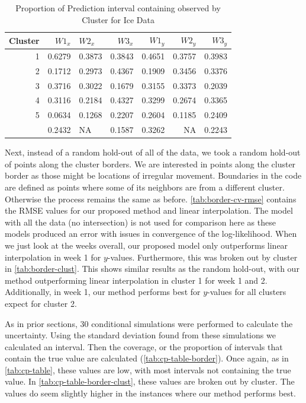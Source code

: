 \documentclass[12pt]{article}
\begin{document}
\begin{table}

\caption{\label{tab:cp-clust-actual}Proportion of Prediction interval containing observed by Cluster for Ice Data}
\centering
\begin{tabular}[t]{rrlrrrr}
\toprule
Cluster & $W1_{x}$ & $W2_{x}$ & $W3_{x}$ & $W1_{y}$ & $W2_{y}$ & $W3_{y}$\\
\midrule
1 & 0.6279 & 0.3873 & 0.3843 & 0.4651 & 0.3757 & 0.3983\\
2 & 0.1712 & 0.2973 & 0.4367 & 0.1909 & 0.3456 & 0.3376\\
3 & 0.3716 & 0.3022 & 0.1679 & 0.3155 & 0.3373 & 0.2039\\
4 & 0.3116 & 0.2184 & 0.4327 & 0.3299 & 0.2674 & 0.3365\\
5 & 0.0634 & 0.1268 & 0.2207 & 0.2604 & 0.1185 & 0.2409\\
\addlinespace
6 & 0.2432 & NA & 0.1587 & 0.3262 & NA & 0.2243\\
\bottomrule
\end{tabular}
\end{table}

Next, instead of a random hold-out of all of the data, we took a random
hold-out of points along the cluster borders. We are interested in
points along the cluster border as those might be locations of irregular
movement. Boundaries in the code are defined as points where some of its
neighbors are from a different cluster. Otherwise the process remains
the same as before. \cref{tab:border-cv-rmse} contains the RMSE values
for our proposed method and linear interpolation. The model with all the
data (no intersection) is not used for comparison here as these models
produced an error with issues in convergence of the log-likelihood. When
we just look at the weeks overall, our proposed model only outperforms
linear interpolation in week 1 for \(y\)-values. Furthermore, this was
broken out by cluster in \cref{tab:border-clust}. This shows similar
results as the random hold-out, with our method outperforming linear
interpolation in cluster 1 for week 1 and 2. Additionally, in week 1,
our method performs best for \(y\)-values for all clusters expect for
cluster 2.

As in prior sections, 30 conditional simulations were performed to
calculate the uncertainty. Using the standard deviation found from these
simulations we calculated an interval. Then the coverage, or the
proportion of intervals that contain the true value are calculated
(\cref{tab:cp-table-border}). Once again, as in \cref{tab:cp-table},
these values are low, with most intervals not containing the true value.
In \cref{tab:cp-table-border-clust}, these values are broken out by
cluster. The values do seem slightly higher in the instances where our
method performs best.
\end{document}
